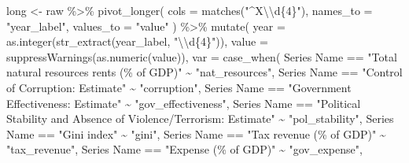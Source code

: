 \documentclass[
  letterpaper,
  DIV=11,
  numbers=noendperiod]{scrartcl}
\newenvironment{Shaded}{\begin{snugshade}}{\end{snugshade}}
\newcommand{\AttributeTok}[1]{\textcolor[rgb]{0.40,0.45,0.13}{#1}}
\newcommand{\FunctionTok}[1]{\textcolor[rgb]{0.28,0.35,0.67}{#1}}
\newcommand{\NormalTok}[1]{\textcolor[rgb]{0.00,0.23,0.31}{#1}}
\newcommand{\OtherTok}[1]{\textcolor[rgb]{0.00,0.23,0.31}{#1}}
\newcommand{\SpecialCharTok}[1]{\textcolor[rgb]{0.37,0.37,0.37}{#1}}
\newcommand{\StringTok}[1]{\textcolor[rgb]{0.13,0.47,0.30}{#1}}
\begin{document}
\begin{Shaded}
\begin{Highlighting}[]
\NormalTok{long }\OtherTok{\textless{}{-}}\NormalTok{ raw }\SpecialCharTok{\%\textgreater{}\%}
  \FunctionTok{pivot\_longer}\NormalTok{(}
    \AttributeTok{cols      =} \FunctionTok{matches}\NormalTok{(}\StringTok{"\^{}X}\SpecialCharTok{\textbackslash{}\textbackslash{}}\StringTok{d\{4\}"}\NormalTok{),}
    \AttributeTok{names\_to  =} \StringTok{"year\_label"}\NormalTok{,}
    \AttributeTok{values\_to =} \StringTok{"value"}
\NormalTok{  ) }\SpecialCharTok{\%\textgreater{}\%}
  \FunctionTok{mutate}\NormalTok{(}
    \AttributeTok{year  =} \FunctionTok{as.integer}\NormalTok{(}\FunctionTok{str\_extract}\NormalTok{(year\_label, }\StringTok{"}\SpecialCharTok{\textbackslash{}\textbackslash{}}\StringTok{d\{4\}"}\NormalTok{)),}
    \AttributeTok{value =} \FunctionTok{suppressWarnings}\NormalTok{(}\FunctionTok{as.numeric}\NormalTok{(value)),}
    \AttributeTok{var   =} \FunctionTok{case\_when}\NormalTok{(}
      \StringTok{\textasciigrave{}}\AttributeTok{Series Name}\StringTok{\textasciigrave{}} \SpecialCharTok{==} \StringTok{"Total natural resources rents (\% of GDP)"}                  \SpecialCharTok{\textasciitilde{}} \StringTok{"nat\_resources"}\NormalTok{,}
      \StringTok{\textasciigrave{}}\AttributeTok{Series Name}\StringTok{\textasciigrave{}} \SpecialCharTok{==} \StringTok{"Control of Corruption: Estimate"}                           \SpecialCharTok{\textasciitilde{}} \StringTok{"corruption"}\NormalTok{,}
      \StringTok{\textasciigrave{}}\AttributeTok{Series Name}\StringTok{\textasciigrave{}} \SpecialCharTok{==} \StringTok{"Government Effectiveness: Estimate"}                        \SpecialCharTok{\textasciitilde{}} \StringTok{"gov\_effectiveness"}\NormalTok{,}
      \StringTok{\textasciigrave{}}\AttributeTok{Series Name}\StringTok{\textasciigrave{}} \SpecialCharTok{==} \StringTok{"Political Stability and Absence of Violence/Terrorism: Estimate"} \SpecialCharTok{\textasciitilde{}} \StringTok{"pol\_stability"}\NormalTok{,}
      \StringTok{\textasciigrave{}}\AttributeTok{Series Name}\StringTok{\textasciigrave{}} \SpecialCharTok{==} \StringTok{"Gini index"}                                                \SpecialCharTok{\textasciitilde{}} \StringTok{"gini"}\NormalTok{,}
      \StringTok{\textasciigrave{}}\AttributeTok{Series Name}\StringTok{\textasciigrave{}} \SpecialCharTok{==} \StringTok{"Tax revenue (\% of GDP)"}                                    \SpecialCharTok{\textasciitilde{}} \StringTok{"tax\_revenue"}\NormalTok{,}
      \StringTok{\textasciigrave{}}\AttributeTok{Series Name}\StringTok{\textasciigrave{}} \SpecialCharTok{==} \StringTok{"Expense (\% of GDP)"}                                        \SpecialCharTok{\textasciitilde{}} \StringTok{"gov\_expense"}\NormalTok{,}

\end{Highlighting}
\end{Shaded}
\end{document}
